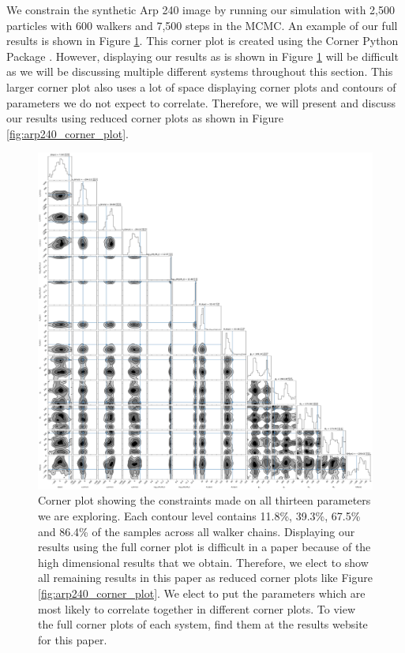 We constrain the synthetic Arp 240 image by running our simulation with 2,500 particles with 600 walkers and 7,500 steps in the MCMC. An example of our full results is shown in Figure \ref{fig:corner_plot}. This corner plot is created using the Corner Python Package \citep{corner}. However, displaying our results as is shown in Figure \ref{fig:corner_plot} will be difficult as we will be discussing multiple different systems throughout this section. This larger corner plot also uses a lot of space displaying corner plots and contours of parameters we do not expect to correlate. Therefore, we will present and discuss our results using reduced corner plots as shown in Figure \ref{fig:arp240_corner_plot}.

\begin{figure}
    \centering
    \includegraphics[width=\textwidth]{Chapter1/figures/Arp240-full-corner.pdf}
    \caption[Corner plot showing the constraints made on all thirteen parameters we are exploring.]{Corner plot showing the constraints made on all thirteen parameters we are exploring. Each contour level contains 11.8\%, 39.3\%, 67.5\% and 86.4\% of the samples across all walker chains. Displaying our results using the full corner plot is difficult in a paper because of the high dimensional results that we obtain. Therefore, we elect to show all remaining results in this paper as reduced corner plots like Figure \ref{fig:arp240_corner_plot}. We elect to put the parameters which are most likely to correlate together in different corner plots. To view the full corner plots of each system, find them at the results website for this paper.}
    \label{fig:corner_plot}
\end{figure}

